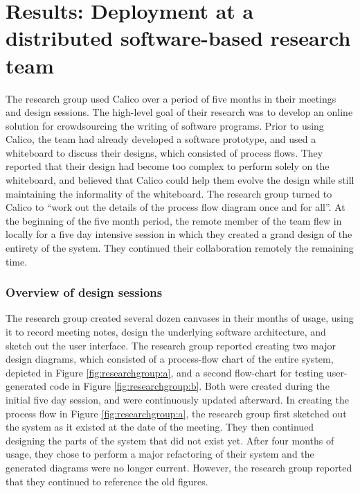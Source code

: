 \section{Results: Deployment at a distributed software-based research team}
\label{chapter:evaluation:deployment3}

The research group used Calico over a period of five months in their meetings and design sessions. The high-level goal of their research was to develop an online solution for crowdsourcing the writing of software programs. Prior to using Calico, the team had already developed a software prototype, and used a whiteboard to discuss their designs, which consisted of process flows. They reported that their design had become too complex to perform solely on the whiteboard, and believed that Calico could help them evolve the design while still maintaining the informality of the whiteboard. The research group turned to Calico to ``work out the details of the process flow diagram once and for all''. At the beginning of the five month period, the remote member of the team flew in locally for a five day intensive session in which they created a grand design of the entirety of the system. They continued their collaboration remotely the remaining time. 

\subsubsection{Overview of design sessions}

The research group created several dozen canvases in their months of usage, using it to record meeting notes, design the underlying software architecture, and sketch out the user interface. The research group reported creating two major design diagrams, which consisted of a process-flow chart of the entire system, depicted in Figure \ref{fig:researchgroup:a}, and a second flow-chart for testing user-generated code in Figure \ref{fig:researchgroup:b}. Both were created during the initial five day session, and were continuously updated afterward. In creating the process flow in Figure \ref{fig:researchgroup:a}, the research group first sketched out the system as it existed at the date of the meeting. They then continued designing the parts of the system that did not exist yet. After four months of usage, they chose to perform a major refactoring of their system and the generated diagrams were no longer current. However, the research group reported that they continued to reference the old figures.



